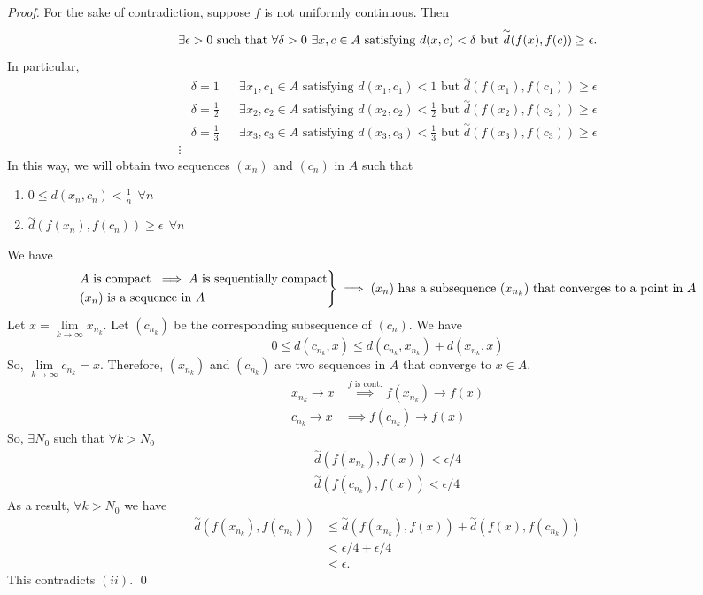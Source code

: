 \begin{proof}
    For the sake of contradiction, suppose $f$ is not uniformly continuous. Then 
    $$\exists \epsilon > 0 \text{ such that } \forall \delta > 0 ~\exists x,c \in A \text{ satisfying $d(x,c) < \delta$ but $\overset{\sim}{d}(f(x), f(c)) \geq \epsilon$.}$$
    In particular,
    \begin{align*}
        &\delta = 1 &&\exists x_1, c_1 \in A \text{ satisfying $d(x_1, c_1) < 1$ but $\overset{\sim}{d}(f(x_1), f(c_1)) \geq \epsilon$} \\
        &\delta = \frac{1}{2} &&\exists x_2, c_2 \in A \text{ satisfying $d(x_2, c_2) < \frac{1}{2}$ but $\overset{\sim}{d}(f(x_2), f(c_2)) \geq \epsilon$} \\
        &\delta = \frac{1}{3} &&\exists x_3, c_3 \in A \text{ satisfying $d(x_3, c_3) < \frac{1}{3}$ but $\overset{\sim}{d}(f(x_3), f(c_3)) \geq \epsilon$} \\
        \vdots
    \end{align*}
    In this way, we will obtain two sequences $(x_n)$ and $(c_n)$ in $A$ such that 
    \begin{enumerate}[$(i)$]
        \item $0 \leq d(x_n, c_n) < \frac{1}{n} ~~\forall n$
        \item $\overset{\sim}{d}(f(x_n), f(c_n)) \geq \epsilon ~~ \forall n$
    \end{enumerate}
    We have
    $$\begin{rcases*}
        A \text{ is compact } \implies A \text{ is sequentially compact} \\
        (x_n) \text{ is a sequence in } A
    \end{rcases*}
    \implies (x_n) \text{ has a subsequence $(x_{n_k})$ that converges to a point in $A$}$$
    Let $x = \lim \limits_{k \to \infty}x_{n_k}.$ Let $(c_{n_k})$ be the corresponding subsequence of $(c_n)$. We have 
    $$0 \leq d(c_{n_k}, x) \leq d(c_{n_k}, x_{n_k}) + d(x_{n_k}, x)$$
    So, $\lim \limits_{k\to \infty} c_{n_k} = x.$ Therefore, $(x_{n_k})$ and $(c_{n_k})$ are two sequences in $A$ that converge to $x\in A$.
    \begin{align*}
        x_{n_k} \to x &\overset{\text{$f$ is cont.}}{\implies} f(x_{n_k}) \to f(x) \\
        c_{n_k} \to x &\implies f(c_{n_k}) \to f(x)
    \end{align*}
    So, $\exists N_0$ such that $\forall k > N_0$
    \begin{align*}
        \overset{\sim}{d}(f(x_{n_k}), f(x)) < \epsilon / 4 \\
        \overset{\sim}{d}(f(c_{n_k}), f(x)) < \epsilon / 4
    \end{align*}
    As a result, $\forall k > N_0$ we have 
    \begin{align*}
        \overset{\sim}{d}(f(x_{n_k}), f(c_{n_k})) &\leq \overset{\sim}{d}(f(x_{n_k}), f(x)) + \overset{\sim}{d}(f(x), f(c_{n_k})) \\
        &< \epsilon / 4 + \epsilon / 4 \\
        &< \epsilon.
    \end{align*}
    This contradicts $(ii)$. \qed
\end{proof}